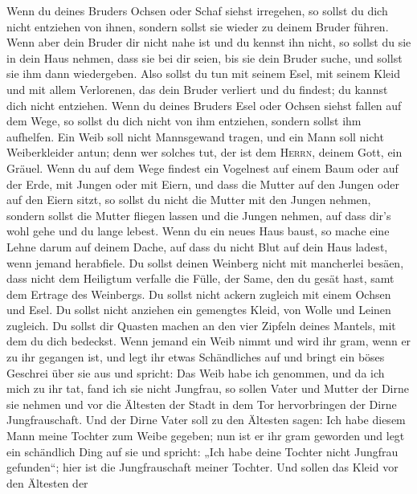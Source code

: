  Wenn du deines Bruders Ochsen oder Schaf siehst
irregehen, so sollst du dich nicht entziehen von ihnen, sondern sollst
sie wieder zu deinem Bruder führen.  Wenn aber dein Bruder
dir nicht nahe ist und du kennst ihn nicht, so sollst du sie in dein
Haus nehmen, dass sie bei dir seien, bis sie dein Bruder suche, und
sollst sie ihm dann wiedergeben.  Also sollst du tun mit
seinem Esel, mit seinem Kleid und mit allem Verlorenen, das dein Bruder
verliert und du findest; du kannst dich nicht entziehen. 
Wenn du deines Bruders Esel oder Ochsen siehst fallen auf dem Wege, so
sollst du dich nicht von ihm entziehen, sondern sollst ihm aufhelfen.
 Ein Weib soll nicht Mannsgewand tragen, und ein Mann soll
nicht Weiberkleider antun; denn wer solches tut, der ist dem
\textsc{Herrn}, deinem Gott, ein Gräuel.  Wenn du auf dem
Wege findest ein Vogelnest auf einem Baum oder auf der Erde, mit Jungen
oder mit Eiern, und dass die Mutter auf den Jungen oder auf den Eiern
sitzt, so sollst du nicht die Mutter mit den Jungen nehmen,
 sondern sollst die Mutter fliegen lassen und die Jungen
nehmen, auf dass dir's wohl gehe und du lange lebest. 
Wenn du ein neues Haus baust, so mache eine Lehne darum auf deinem
Dache, auf dass du nicht Blut auf dein Haus ladest, wenn jemand
herabfiele.  Du sollst deinen Weinberg nicht mit
mancherlei besäen, dass nicht dem Heiligtum verfalle die Fülle, der
Same, den du gesät hast, samt dem Ertrage des Weinbergs. 
Du sollst nicht ackern zugleich mit einem Ochsen und Esel.
 Du sollst nicht anziehen ein gemengtes Kleid, von Wolle
und Leinen zugleich.  Du sollst dir Quasten machen an den
vier Zipfeln deines Mantels, mit dem du dich bedeckst. 
Wenn jemand ein Weib nimmt und wird ihr gram, wenn er zu ihr gegangen
ist,  und legt ihr etwas Schändliches auf und bringt ein
böses Geschrei über sie aus und spricht: Das Weib habe ich genommen, und
da ich mich zu ihr tat, fand ich sie nicht Jungfrau,  so
sollen Vater und Mutter der Dirne sie nehmen und vor die Ältesten der
Stadt in dem Tor hervorbringen der Dirne Jungfrauschaft. 
Und der Dirne Vater soll zu den Ältesten sagen: Ich habe diesem Mann
meine Tochter zum Weibe gegeben; nun ist er ihr gram geworden
 und legt ein schändlich Ding auf sie und spricht: „Ich
habe deine Tochter nicht Jungfrau gefunden``; hier ist die
Jungfrauschaft meiner Tochter. Und sollen das Kleid vor den Ältesten der
